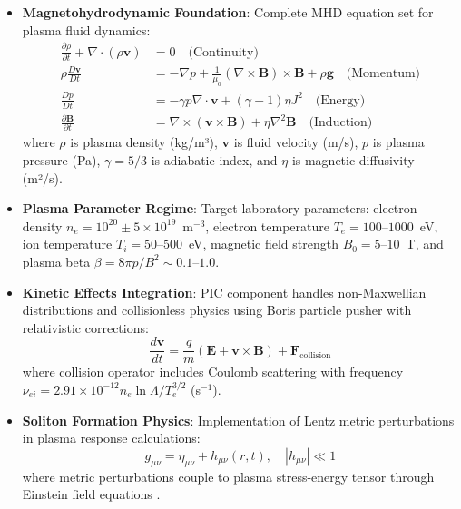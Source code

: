 \documentclass[12pt,a4paper]{article}
\begin{document}
\begin{itemize}
\item \textbf{Magnetohydrodynamic Foundation}: Complete MHD equation set for plasma fluid dynamics:
\begin{align}
\frac{\partial \rho}{\partial t} + \nabla \cdot (\rho \mathbf{v}) &= 0 \quad \text{(Continuity)} \\
\rho \frac{D\mathbf{v}}{Dt} &= -\nabla p + \frac{1}{\mu_0}(\nabla \times \mathbf{B}) \times \mathbf{B} + \rho \mathbf{g} \quad \text{(Momentum)} \\
\frac{Dp}{Dt} &= -\gamma p \nabla \cdot \mathbf{v} + (\gamma - 1) \eta J^2 \quad \text{(Energy)} \\
\frac{\partial \mathbf{B}}{\partial t} &= \nabla \times (\mathbf{v} \times \mathbf{B}) + \eta \nabla^2 \mathbf{B} \quad \text{(Induction)}
\end{align}
where $\rho$ is plasma density (kg/m³), $\mathbf{v}$ is fluid velocity (m/s), $p$ is plasma pressure (Pa), $\gamma = 5/3$ is adiabatic index, and $\eta$ is magnetic diffusivity (m²/s).

\item \textbf{Plasma Parameter Regime}: Target laboratory parameters: electron density $n_e = 10^{20} \pm 5 \times 10^{19}$~m$^{-3}$, electron temperature $T_e = 100$--$1000$~eV, ion temperature $T_i = 50$--$500$~eV, magnetic field strength $B_0 = 5$--$10$~T, and plasma beta $\beta = 8\pi p / B^2 \sim 0.1$--$1.0$.

\item \textbf{Kinetic Effects Integration}: PIC component handles non-Maxwellian distributions and collisionless physics using Boris particle pusher with relativistic corrections:
\begin{equation}
\frac{d\mathbf{v}}{dt} = \frac{q}{m}\left(\mathbf{E} + \mathbf{v} \times \mathbf{B}\right) + \mathbf{F}_{\text{collision}}
\end{equation}
where collision operator includes Coulomb scattering with frequency $\nu_{ei} = 2.91 \times 10^{-12} n_e \ln\Lambda / T_e^{3/2}$ (s$^{-1}$).

\item \textbf{Soliton Formation Physics}: Implementation of Lentz metric perturbations in plasma response calculations:
\begin{equation}
g_{\mu\nu} = \eta_{\mu\nu} + h_{\mu\nu}(r,t), \quad |h_{\mu\nu}| \ll 1
\end{equation}
where metric perturbations couple to plasma stress-energy tensor through Einstein field equations \cite{QuantumFieldTheory2019}.


\end{itemize}
\end{document}
